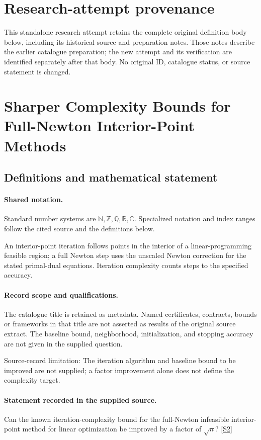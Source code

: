 \documentclass[11pt]{article}
\begin{document}
\section*{Research-attempt provenance}
This standalone research attempt retains the complete original definition body below,
including its historical source and preparation notes. Those notes describe the
earlier catalogue preparation; the new attempt and its verification are identified
separately after that body. No original ID, catalogue status, or source statement is changed.

\section{Sharper Complexity Bounds for Full-Newton Interior-Point Methods}\label{statement}

\subsection{Definitions and mathematical statement}

\paragraph{Shared notation.}Standard number systems are $\mathbb N,\mathbb Z,\mathbb Q,\mathbb R,\mathbb C$. Specialized notation and index ranges follow the cited source and the definitions below.


An interior-point iteration follows points in the interior of a linear-programming feasible region; a full Newton step uses the unscaled Newton correction for the stated primal-dual equations. Iteration complexity counts steps to the specified accuracy.
\paragraph{Record scope and qualifications.}
The catalogue title is retained as metadata. Named certificates, contracts, bounds or frameworks in that title are not asserted as results of the original source extract.
The baseline bound, neighborhood, initialization, and stopping accuracy are not given in the supplied question.

Source-record limitation: The iteration algorithm and baseline bound to be improved are not supplied; a factor improvement alone does not define the complexity target.
\paragraph{Statement recorded in the supplied source.}
Can the known iteration-complexity bound for the full-Newton infeasible interior-point method for linear optimization be improved by a factor of $\sqrt n$? \href{https://doi.org/10.4171/owr/2005/02}{[S2]}
\end{document}
